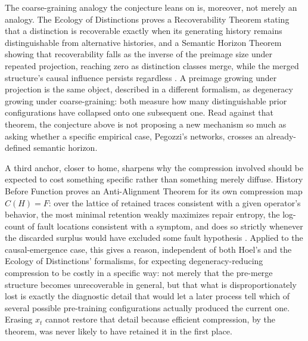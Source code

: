 \documentclass[11pt]{article}
\begin{document}
The coarse-graining analogy the conjecture leans on is, moreover, not merely an analogy. The Ecology of Distinctions proves a Recoverability Theorem stating that a distinction is recoverable exactly when its generating history remains distinguishable from alternative histories, and a Semantic Horizon Theorem showing that recoverability falls as the inverse of the preimage size under repeated projection, reaching zero as distinction classes merge, while the merged structure's causal influence persists regardless \cite{ecologydistinctions}. A preimage growing under projection is the same object, described in a different formalism, as degeneracy growing under coarse-graining: both measure how many distinguishable prior configurations have collapsed onto one subsequent one. Read against that theorem, the conjecture above is not proposing a new mechanism so much as asking whether a specific empirical case, Pegozzi's networks, crosses an already-defined semantic horizon.

A third anchor, closer to home, sharpens why the compression involved should be expected to cost something specific rather than something merely diffuse. History Before Function proves an Anti-Alignment Theorem for its own compression map $C(H)=F$: over the lattice of retained traces consistent with a given operator's behavior, the most minimal retention weakly maximizes repair entropy, the log-count of fault locations consistent with a symptom, and does so strictly whenever the discarded surplus would have excluded some fault hypothesis \cite{historybeforefunction}. Applied to the causal-emergence case, this gives a reason, independent of both Hoel's and the Ecology of Distinctions' formalisms, for expecting degeneracy-reducing compression to be costly in a specific way: not merely that the pre-merge structure becomes unrecoverable in general, but that what is disproportionately lost is exactly the diagnostic detail that would let a later process tell which of several possible pre-training configurations actually produced the current one. Erasing $x_t$ cannot restore that detail because efficient compression, by the theorem, was never likely to have retained it in the first place.
\end{document}
